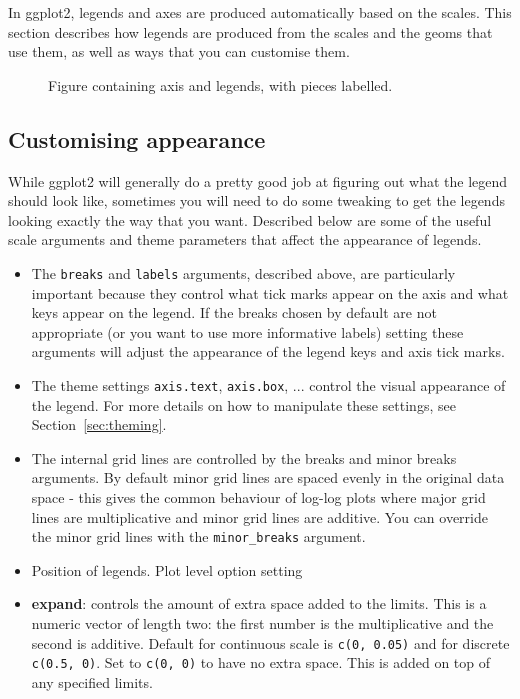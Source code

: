 In ggplot2, legends and axes are produced automatically based on the scales.  This section describes how legends are produced from the scales and the geoms that use them, as well as ways that you can customise them.

\begin{figure}[htbp]
  \centering
  \caption{Figure containing axis and legends, with pieces labelled.}
  \label{fig:label}
\end{figure}

\subsection{Customising appearance}

While ggplot2 will generally do a pretty good job at figuring out what the legend should look like, sometimes you will need to do some tweaking to get the legends looking exactly the way that you want.  Described below are some of the useful scale arguments and theme parameters that affect the appearance of legends.  

\begin{itemize}
  \item The {\tt breaks} and {\tt labels} arguments, described above, are particularly important because they control what tick marks appear on the axis and what keys appear on the legend.  If the breaks chosen by default are not appropriate (or you want to use more informative labels) setting these arguments will adjust the appearance of the legend keys and axis tick marks.  
  
  \item The theme settings {\tt axis.text}, {\tt axis.box}, ... control the visual appearance of the legend.  For more details on how to manipulate these settings, see Section~\ref{sec:theming}.

  \item The internal grid lines are controlled by the breaks and minor breaks arguments.  By default minor grid lines are spaced evenly in the original data space - this gives the common behaviour of log-log plots where major grid lines are multiplicative and minor grid lines are additive.  You can override the minor grid lines with the {\tt minor\_breaks} argument.
  
  \item Position of legends.  Plot level option setting 
  
  \item {\bf expand}: controls the amount of extra space added to the limits.  This is a numeric vector of length two: the first number is the multiplicative and the second is additive.  Default for continuous scale is {\tt c(0, 0.05)} and for discrete {\tt c(0.5, 0)}.  Set to {\tt c(0, 0)} to have no extra space.  This is added on top of any specified limits.
  
\end{itemize}

